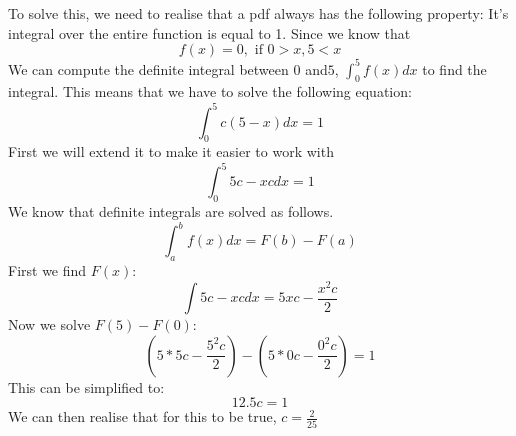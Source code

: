 To solve this, we need to realise that a pdf always has the following property: It's integral over the entire function is equal to 1. Since we know that 
$$f(x) = 0,\text{ if } 0 > x, 5 < x$$
We can compute the definite integral between $0$ and$5$, $\int_0^5f(x)dx$ to find the integral. This means that we have to solve the following equation:
$$
\int_0^5c(5-x)dx = 1
$$
First we will extend it to make it easier to work with
$$
\int_0^5 5c - xc dx= 1
$$
We know that definite integrals are solved as follows.
$$
\int_a^bf(x)dx = F(b) - F(a)
$$
First we find $F(x)$:
$$
\int 5c - xc dx= 5xc - \frac{x^2c}{2}
$$
Now we solve $F(5) - F(0)$:
$$
(5*5c - \frac{5^2c}{2}) - (5*0c - \frac{0^2c}{2}) = 1
$$
This can be simplified to:
$$
12.5c = 1
$$
We can then realise that for this to be true, $c = \frac{2}{25}$